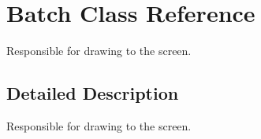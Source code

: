\hypertarget{class_batch}{\section{Batch Class Reference}
\label{class_batch}
}


Responsible for drawing to the screen.  




\subsection{Detailed Description}
Responsible for drawing to the screen. 